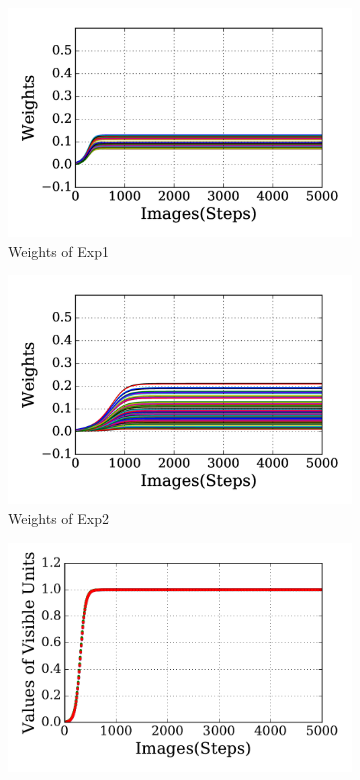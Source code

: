 \begin{figure}
	\centering
	\begin{subfigure}[t]{0.45\textwidth}
		\includegraphics[width=\textwidth]{pics_sdlm/20_exp_AE/exp1_weights_non.png}
		\caption{Weights of Exp1}
	\end{subfigure}
	\begin{subfigure}[t]{0.45\textwidth}
		\includegraphics[width=\textwidth]{pics_sdlm/20_exp_AE/exp2_weights_non.png}
		\caption{Weights of Exp2}
	\end{subfigure}
	\begin{subfigure}[t]{0.45\textwidth}
		\includegraphics[width=\textwidth]{pics_sdlm/20_exp_AE/exp1_recon_non.pdf}

\end{subfigure}
\end{figure}
